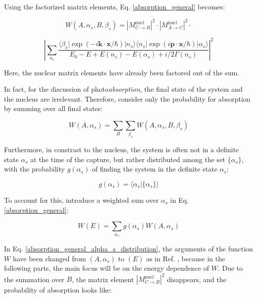 \documentclass{article}
\begin{document}
Using the factorized matrix elements, Eq. \ref{absorption_general} becomes:

\begin{equation}
\label{absorption_general_factorized}
	W (A, \alpha_s, B, \beta_s)= \left| M^{\mathrm{nucl}}_{C \to B} \right|^2 \cdot \left| M^{\mathrm{nucl}}_{A \to C} \right|^2 \cdot 
\end{equation}

\begin{equation*}
\left| \sum_{n_s} \frac{ \langle \beta_s | \exp{\left( - i \mathbf{k} \cdot \mathbf{x} / \hbar \right)} | n_s \rangle \langle n_s | \exp{\left( i \mathbf{p} \cdot \mathbf{x} / \hbar \right)} | \alpha_s \rangle  }{E_0 - E + E(n_s) - E(\alpha_s) + i/2 \Gamma(n_s)} \right| ^2
\end{equation*}

Here, the nuclear matrix elements have already been factored out of the sum.

In fact, for the discussion of photo\textit{absorption}, the final state of the system and the nucleus are irrelevant. Therefore, consider only the probability for absorption by summing over all final states:

\begin{equation}
\label{absorption_general_no_final}
	W(A, \alpha_s) = \sum_{B} \sum_{\beta_s} W(A, \alpha_s, B, \beta_s)
\end{equation}


Furthermore, in constrast to the nucleus, the system is often not in a definite state $\alpha_s$ at the time of the capture, but rather distributed among the set $\{ \alpha_s \}$, with the probability $g(\alpha_s)$ of finding the system in the definite state $\alpha_s$:

\begin{equation}
	\label{g_alpha}
	g(\alpha_s) = \langle \alpha_s | \{ \alpha_s \} \rangle
\end{equation}

To account for this, introduce a weighted sum over $\alpha_s$ in Eq. \ref{absorption_general}:

\begin{equation}
\label{absorption_general_alpha_s_distribution}
	W(E) = \sum_{\alpha_s} g(\alpha_s) W(A, \alpha_s)
\end{equation}

In Eq. \ref{absorption_general_alpha_s_distribution}, the arguments of the function $W$ have been changed from $\left( A, \alpha_s \right)$ to $\left( E \right)$ as in Ref. \cite{Lam39}, because in the following parts, the main focus will be on the energy dependence of $W$.
Due to the summation over $B$, the matrix element $\left| M^{\mathrm{nucl}}_{C \to B} \right|^2$ disappears, and the probability of absorption looks like:
\end{document}

